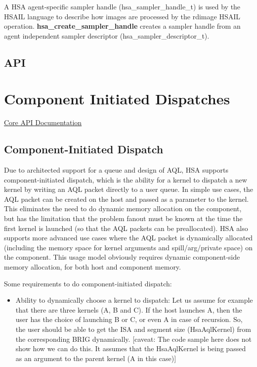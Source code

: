 \documentclass{book}
\newcommand{\reffun}[1]{\textbf{#1}}
\newcommand{\reftyp}[1]{#1}
\begin{document}
\begin{appendices}
A HSA agent-specific sampler handle (\reftyp{hsa\_sampler\_handle\_t})
is used by the HSAIL language to describe how images are processed by
the rdimage HSAIL operation. \reffun{hsa\_create\_sampler\_handle}
creates a sampler handle from an agent independent sampler descriptor
(\reftyp{hsa\_sampler\_descriptor\_t}).

\hypertarget{Images API}{\section{API} \label{images_api}}


\chapter{Component Initiated Dispatches} \label{architected}
\hypertarget{architectedchptr}{}

\hyperlink{coreapi}{Core API
Documentation}\hypertarget{coreapi_dtde}{}\section{Component-\/\-Initiated
Dispatch}\label{coreapi_dtde}

Due to architected support for a queue and design of AQL,
HSA supports component-\/initiated dispatch, which is the ability
for a kernel to dispatch a new kernel by writing an AQL packet
directly to a user queue. In simple use cases, the AQL packet
can be created on the host and passed as a parameter to the kernel.
This eliminates the need to do dynamic memory allocation on the
component, but has the limitation that the problem fanout must be known
at the time the first kernel is launched (so that the AQL
packets can be preallocated). HSA also supports more advanced
use cases where the AQL packet is dynamically allocated
(including the memory space for kernel arguments and
spill/arg/private space) on the component. This usage model obviously
requires dynamic component-\/side memory allocation, for both host and
component memory.

Some requirements to do component-\/initiated dispatch:
\begin{itemize}
\item Ability to dynamically choose a kernel to dispatch\-: Let us
assume for example that there are three kernels (A, B and C). If the
host launches A, then the user has the choice of launching B or C,
or even A in case of recursion. So, the user should be able to get
the ISA and segment size (Hsa\-Aql\-Kernel) from the
corresponding BRIG dynamically. \mbox{[}caveat\-: The code
sample here does not show how we can do this. It assumes that the
Hsa\-Aql\-Kernel is being passed as an argument to the parent kernel
(A in this case)\mbox{]}


\end{itemize}
\end{appendices}
\end{document}
